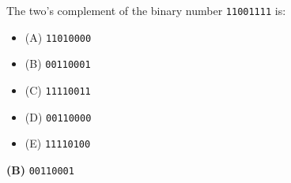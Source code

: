 

The two's complement of the binary number {\tt 11001111} is:

\begin{itemize}
\item{(A)} {\tt 11010000}
\vskip 5pt 
\item{(B)} {\tt 00110001}
\vskip 5pt 
\item{(C)} {\tt 11110011}
\vskip 5pt 
\item{(D)} {\tt 00110000}
\vskip 5pt 
\item{(E)} {\tt 11110100}
\end{itemize}







{\bf (B)} {\tt 00110001}
 










